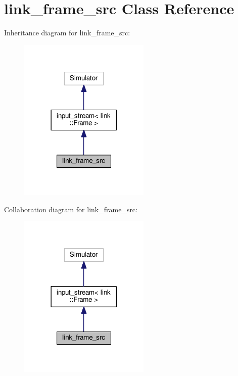 \hypertarget{classlink__frame__src}{}\section{link\+\_\+frame\+\_\+src Class Reference}
\label{classlink__frame__src}


Inheritance diagram for link\+\_\+frame\+\_\+src\+:
\nopagebreak
\begin{figure}[H]
\begin{center}
\leavevmode
\includegraphics[width=177pt]{classlink__frame__src__inherit__graph}
\end{center}
\end{figure}


Collaboration diagram for link\+\_\+frame\+\_\+src\+:
\nopagebreak
\begin{figure}[H]
\begin{center}
\leavevmode
\includegraphics[width=177pt]{classlink__frame__src__coll__graph}
\end{center}
\end{figure}
